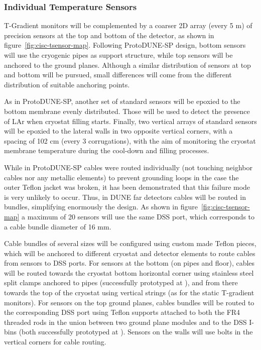 \subsubsection{Individual Temperature Sensors}

T-Gradient monitors will be complemented by a coarser 2D array (every 5 m) of precision sensors at the top and bottom of the detector, as shown in figure~\ref{fig:cisc-tsensor-map}. Following ProtoDUNE-SP design, bottom sensors will use the cryogenic pipes as support structure, while top sensors will be anchored to the ground planes. Although a similar distribution of sensors at top and bottom will be pursued, small differences will come from the different distribution of suitable anchoring points. 

As in ProtoDUNE-SP, another set of standard sensors will be epoxied to the bottom membrane evenly distributed. Those will be used to detect the presence of LAr when cryostat filling starts. Finally, two vertical arrays of standard sensors will be epoxied to the lateral walls in two opposite vertical corners, with a spacing of 102 cm (every 3 corrugations), with the aim of monitoring the cryostat membrane temperature during the cool-down and filling processes. 

While in ProtoDUNE-SP cables were routed individually (not touching neighbor cables nor any metallic elements) to prevent grounding loops in the case the outer Teflon jacket was broken, it has been demonstrated that this failure mode is very unlikely to occur. Thus, in DUNE far detectors cables will be routed in bundles, simplifying enormously the design. As shown in figure~\ref{fig:cisc-tsensor-map} a maximum of 20 sensors will use the same DSS port, which corresponds to a cable bundle diameter of 16 mm.

Cable bundles of several sizes will be configured using custom made Teflon 
pieces,  %
which will be anchored to different cryostat and detector elements to route cables from sensors to DSS ports. For sensors at the bottom (on pipes and floor), cables will be routed towards the cryostat bottom horizontal corner using stainless steel split clamps anchored to pipes (successfully prototyped at ), and from there towards the top of the cryostat using vertical strings (as for the static T-gradient monitors). For sensors on the top ground planes, cables bundles will be routed to the corresponding DSS port using Teflon supports attached to both the FR4 threaded rods in the union between two ground plane modules and to the DSS I-bins (both successfully prototyped at ). Sensors on the walls will use bolts in the vertical corners for cable routing. 

